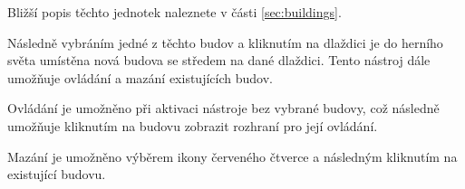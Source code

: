 \medskip
{}

\medskip
{}

\medskip
{}

\medskip
{}

\medskip
{}

\bigskip

Bližší popis těchto jednotek naleznete v části \ref{sec:buildings}.

Následně vybráním jedné z těchto budov a kliknutím na dlaždici je do herního světa umístěna nová budova se středem na dané dlaždici. Tento nástroj dále umožňuje ovládání a mazání existujících budov. 

Ovládání je umožněno při aktivaci nástroje bez vybrané budovy, což následně umožňuje kliknutím na budovu zobrazit rozhraní pro její ovládání.

Mazání je umožněno výběrem ikony červeného čtverce a následným kliknutím na existující budovu.

